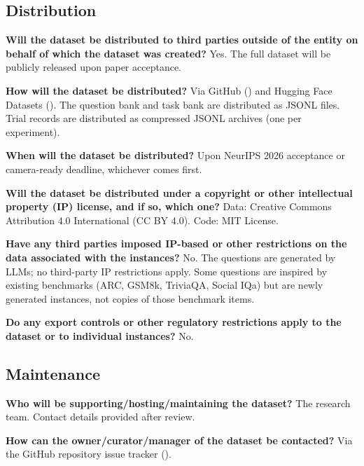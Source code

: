 \subsection*{Distribution}

\textbf{Will the dataset be distributed to third parties outside of the entity on
behalf of which the dataset was created?}
Yes. The full dataset will be publicly released upon paper acceptance.

\textbf{How will the dataset be distributed?}
Via GitHub () and Hugging Face Datasets ().
The question bank and task bank are distributed as JSONL files.
Trial records are distributed as compressed JSONL archives (one per experiment).

\textbf{When will the dataset be distributed?}
Upon NeurIPS 2026 acceptance or camera-ready deadline, whichever comes first.

\textbf{Will the dataset be distributed under a copyright or other intellectual
property (IP) license, and if so, which one?}
Data: Creative Commons Attribution 4.0 International (CC BY 4.0).
Code: MIT License.

\textbf{Have any third parties imposed IP-based or other restrictions on the data
associated with the instances?}
No. The questions are generated by LLMs; no third-party IP restrictions apply.
Some questions are inspired by existing benchmarks (ARC, GSM8k, TriviaQA, Social IQa)
but are newly generated instances, not copies of those benchmark items.

\textbf{Do any export controls or other regulatory restrictions apply to the dataset or
to individual instances?}
No.

\subsection*{Maintenance}

\textbf{Who will be supporting/hosting/maintaining the dataset?}
The research team. Contact details provided after review.

\textbf{How can the owner/curator/manager of the dataset be contacted?}
Via the GitHub repository issue tracker ().

